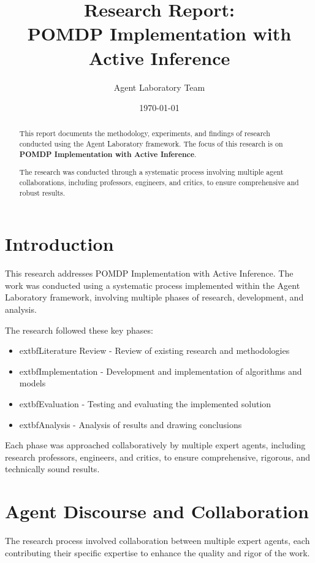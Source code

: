\documentclass[11pt,a4paper]{article}
\title{\textbf{\Large{Research Report:} \\ \huge{\textsf{POMDP Implementation with Active Inference}}}}}
\author{Agent Laboratory Team}
\date{\today}
\begin{document}
\maketitle

\begin{abstract}
This report documents the methodology, experiments, and findings of research conducted using the Agent Laboratory framework. The focus of this research is on \textbf{POMDP Implementation with Active Inference}.

The research was conducted through a systematic process involving multiple agent collaborations, including professors, engineers, and critics, to ensure comprehensive and robust results.
\end{abstract}

\tableofcontents
\newpage

\section{Introduction}
This research addresses POMDP Implementation with Active Inference. The work was conducted using a systematic process implemented within the Agent Laboratory framework, involving multiple phases of research, development, and analysis.

The research followed these key phases:
\begin{itemize}

\item 	extbf{Literature Review} - Review of existing research and methodologies
\item 	extbf{Implementation} - Development and implementation of algorithms and models
\item 	extbf{Evaluation} - Testing and evaluating the implemented solution
\item 	extbf{Analysis} - Analysis of results and drawing conclusions

\end{itemize}

Each phase was approached collaboratively by multiple expert agents, including research professors, engineers, and critics, to ensure comprehensive, rigorous, and technically sound results.


\section{Agent Discourse and Collaboration}

The research process involved collaboration between multiple expert agents, each contributing their specific expertise to enhance the quality and rigor of the work.
\end{document}
